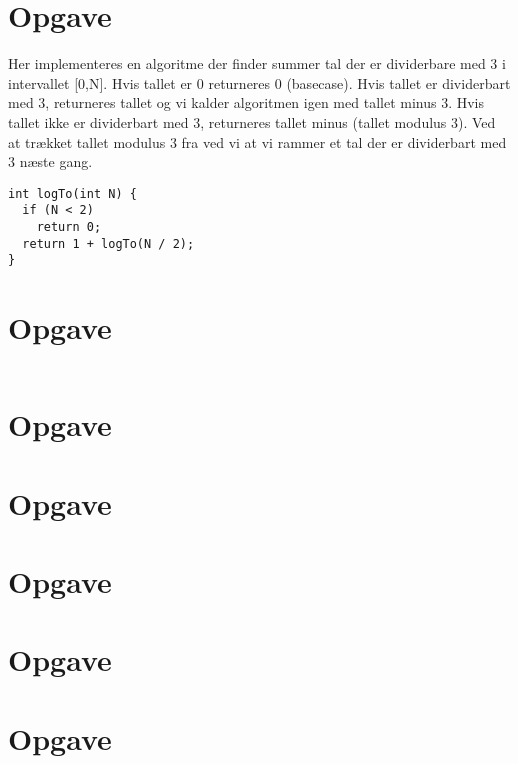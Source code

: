 \documentclass{article}
\begin{document}
\section{Opgave} %
Her implementeres en algoritme der finder summer tal der er dividerbare med 3
i intervallet [0,N].
Hvis tallet er 0 returneres 0 (basecase).
Hvis tallet er dividerbart med 3, returneres tallet og vi kalder algoritmen igen
med tallet minus 3. 
Hvis tallet ikke er dividerbart med 3, returneres tallet minus (tallet modulus 3).
Ved at trækket tallet modulus 3 fra ved vi at vi rammer et tal der er dividerbart
med 3 næste gang.
\begin{verbatim}
int logTo(int N) {
  if (N < 2)
    return 0;
  return 1 + logTo(N / 2);
}
\end{verbatim}


\section{Opgave} %
\inputminted{cpp}{../port_10.cpp}

\section{Opgave} %

\section{Opgave} %

\section{Opgave} %

\section{Opgave} %

\section{Opgave} %
\end{document}
